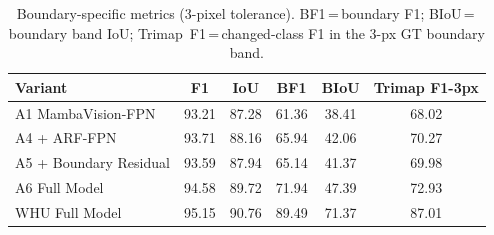 \begin{table}[t]
\centering
\caption{Boundary-specific metrics (3-pixel tolerance). BF1\,=\,boundary F1;
  BIoU\,=\,boundary band IoU; Trimap~F1\,=\,changed-class F1 in the 3-px GT boundary band.}
\label{tab:boundary_metrics}
\begin{tabular}{lccccc}
\toprule
Variant & F1 & IoU & BF1 & BIoU & Trimap F1-3px \\
\midrule
A1 MambaVision-FPN & 93.21 & 87.28 & 61.36 & 38.41 & 68.02 \\
A4 + ARF-FPN & 93.71 & 88.16 & 65.94 & 42.06 & 70.27 \\
A5 + Boundary Residual & 93.59 & 87.94 & 65.14 & 41.37 & 69.98 \\
A6 Full Model & 94.58 & 89.72 & 71.94 & 47.39 & 72.93 \\
WHU Full Model & 95.15 & 90.76 & 89.49 & 71.37 & 87.01 \\
\bottomrule
\end{tabular}
\end{table}